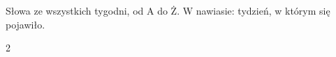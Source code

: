 \section*{\lblDiccionario}

Słowa ze wszystkich tygodni, od A do Ż. W nawiasie: tydzień, w którym
się pojawiło.

\begin{multicols}{2}
\begin{itemize}[leftmargin=0mm, label={}, itemsep=3mm, topsep=0mm]

\end{itemize}
\end{multicols}
\newpage
